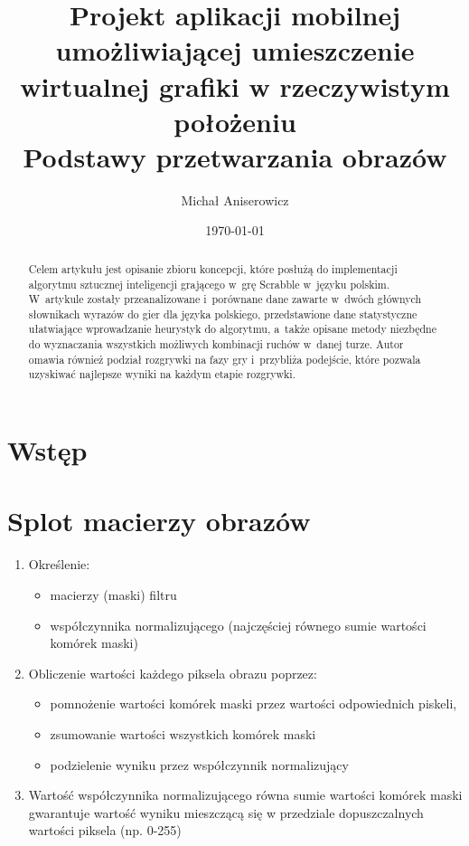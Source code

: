 \documentclass[a4paper,twocolumn,12pt]{article}
\title{
 \LARGE{Projekt aplikacji mobilnej umożliwiającej umieszczenie wirtualnej grafiki w rzeczywistym położeniu} 
 \\ \vspace{2mm} 
 \large{Podstawy przetwarzania obrazów}
}
\author{Michał Aniserowicz}
\date{\today}
\begin{document}
\maketitle

\begin{abstract}
Celem artykułu jest opisanie zbioru koncepcji, które posłużą do implementacji algorytmu sztucznej inteligencji grającego w~grę Scrabble w~języku polskim. W~artykule zostały przeanalizowane i~porównane dane zawarte w~dwóch głównych słownikach wyrazów do gier dla języka polskiego, przedstawione dane statystyczne ułatwiające wprowadzanie heurystyk do algorytmu, a~także opisane metody niezbędne do wyznaczania wszystkich możliwych kombinacji ruchów w~danej turze. Autor omawia również podział rozgrywki na fazy gry i~przybliża podejście, które pozwala uzyskiwać najlepsze wyniki na każdym etapie rozgrywki.
\end{abstract}

\section*{Wstęp}



\section{Splot macierzy obrazów}

\begin{enumerate}
 \item Określenie:
  \begin{itemize}
   \item macierzy (maski) filtru
   \item współczynnika normalizującego (najczęściej równego sumie wartości komórek maski)
  \end{itemize}
 \item Obliczenie wartości każdego piksela obrazu poprzez:
  \begin{itemize}
   \item pomnożenie wartości komórek maski przez wartości odpowiednich piskeli,
   \item zsumowanie wartości wszystkich komórek maski
   \item podzielenie wyniku przez współczynnik normalizujący
  \end{itemize}
 \item Wartość współczynnika normalizującego równa sumie wartości komórek maski gwarantuje wartość wyniku mieszczącą się w przedziale dopuszczalnych wartości piksela (np. 0-255)
\end{enumerate}
\end{document}
